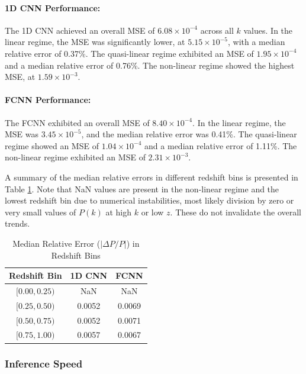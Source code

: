 \documentclass[twocolumn]{aastex631}
\begin{document}
\paragraph{1D CNN Performance:}

The 1D CNN achieved an overall MSE of $6.08 \times 10^{-4}$ across all $k$ values. In the linear regime, the MSE was significantly lower, at $5.15 \times 10^{-5}$, with a median relative error of 0.37\%. The quasi-linear regime exhibited an MSE of $1.95 \times 10^{-4}$ and a median relative error of 0.76\%. The non-linear regime showed the highest MSE, at $1.59 \times 10^{-3}$.

\paragraph{FCNN Performance:}

The FCNN exhibited an overall MSE of $8.40 \times 10^{-4}$. In the linear regime, the MSE was $3.45 \times 10^{-5}$, and the median relative error was 0.41\%. The quasi-linear regime showed an MSE of $1.04 \times 10^{-4}$ and a median relative error of 1.11\%. The non-linear regime exhibited an MSE of $2.31 \times 10^{-3}$.

A summary of the median relative errors in different redshift bins is presented in Table \ref{tab:redshift_error}. Note that NaN values are present in the non-linear regime and the lowest redshift bin due to numerical instabilities, most likely division by zero or very small values of $P(k)$ at high $k$ or low $z$. These do not invalidate the overall trends.

\begin{table}[h]
\centering
\caption{Median Relative Error ($|\Delta P/P|$) in Redshift Bins}
\label{tab:redshift_error}
\begin{tabular}{ccc}
\hline
Redshift Bin & 1D CNN & FCNN \\
\hline
$[0.00, 0.25)$ & NaN & NaN \\
$[0.25, 0.50)$ & 0.0052 & 0.0069 \\
$[0.50, 0.75)$ & 0.0052 & 0.0071 \\
$[0.75, 1.00)$ & 0.0057 & 0.0067 \\
\hline
\end{tabular}
\end{table}

\subsubsection{Inference Speed}
\end{document}
